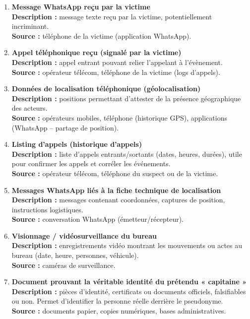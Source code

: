 \documentclass[12pt]{article}
\begin{document}
\begin{enumerate}[label=\textbf{E\arabic* —}, leftmargin=2cm]

\item \textbf{Message WhatsApp reçu par la victime} \\
\textbf{Description :} message texte reçu par la victime, potentiellement incriminant. \\
\textbf{Source :} téléphone de la victime (application WhatsApp).

\item \textbf{Appel téléphonique reçu (signalé par la victime)} \\
\textbf{Description :} appel entrant pouvant relier l’appelant à l’évènement. \\
\textbf{Source :} opérateur télécom, téléphone de la victime (logs d’appels).

\item \textbf{Données de localisation téléphonique (géolocalisation)} \\
\textbf{Description :} positions permettant d’attester de la présence géographique des acteurs. \\
\textbf{Source :} opérateurs mobiles, téléphone (historique GPS), applications (WhatsApp – partage de position).

\item \textbf{Listing d’appels (historique d’appels)} \\
\textbf{Description :} liste d’appels entrants/sortants (dates, heures, durées), utile pour confirmer les appels et corréler les événements. \\
\textbf{Source :} opérateur télécom, téléphone du suspect ou de la victime.

\item \textbf{Messages WhatsApp liés à la fiche technique de localisation} \\
\textbf{Description :} messages contenant coordonnées, captures de position, instructions logistiques. \\
\textbf{Source :} conversation WhatsApp (émetteur/récepteur).

\item \textbf{Visionnage / vidéosurveillance du bureau} \\
\textbf{Description :} enregistrements vidéo montrant les mouvements ou actes au bureau (date, heure, personnes, véhicule). \\
\textbf{Source :} caméras de surveillance.

\item \textbf{Document prouvant la véritable identité du prétendu « capitaine »} \\
\textbf{Description :} pièces d’identité, certificats ou documents officiels, falsifiables ou non. Permet d’identifier la personne réelle derrière le pseudonyme. \\
\textbf{Source :} documents papier, copies numériques, bases administratives.


\end{enumerate}
\end{document}
